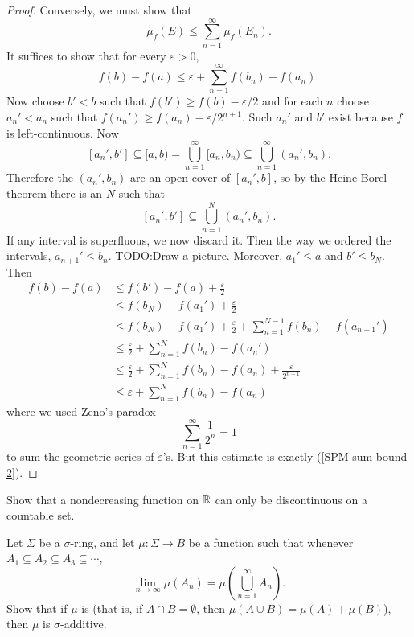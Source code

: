 \begin{proof}
Conversely, we must show that
\[\mu_{f}(E) \leq \sum_{n=1}^{\infty} \mu_{f}(E_{n}).\]
It suffices to show that for every $\varepsilon > 0$,
\begin{equation}\label{SPM sum bound 2}
f(b) - f(a) \leq \varepsilon + \sum_{n=1}^{\infty} f(b_{n}) - f(a_{n}).
\end{equation}
Now choose $b' < b$ such that $f(b') \geq f(b) - \varepsilon/2$ and for each $n$ choose $a_{n}' < a_{n}$ such that $f(a_{n}') \geq f(a_{n}) - \varepsilon/2^{n+1}$.
Such $a_{n}'$ and $b'$ exist because $f$ is left-continuous.
Now
\[[a_{n}', b'] \subseteq [a, b) = \bigcup_{n=1}^{\infty} [a_{n}, b_{n}) \subseteq \bigcup_{n=1}^{\infty} (a_{n}', b_{n}).\]
Therefore the $(a_{n}', b_{n})$ are an open cover of $[a_{n}', b]$, so by the Heine-Borel theorem there is an $N$ such that
\[[a_{n}', b'] \subseteq \bigcup_{n=1}^{N} (a_{n}', b_{n}).\]
If any interval is superfluous, we now discard it.
Then the way we ordered the intervals, $a_{n+1}' \leq b_{n}$.
TODO:\@ Draw a picture.
Moreover, $a_{1}' \leq a$ and $b' \leq b_{N}$. Then
\begin{align*}
f(b) - f(a) &\leq f(b') - f(a) + \frac{\varepsilon}{2}\\
& \leq f(b_{N}) - f(a_{1}') + \frac{\varepsilon}{2}\\
& \leq f(b_{N}) - f(a_{1}') + \frac{\varepsilon}{2} + \sum_{n=1}^{N-1} f(b_{n}) - f(a_{n+1}')\\
& \leq \frac{\varepsilon}{2} + \sum_{n=1}^{N} f(b_{n}) - f(a_{n}')\\
& \leq \frac{\varepsilon}{2} + \sum_{n=1}^{N} f(b_{n}) - f(a_{n}) + \frac{\varepsilon}{2^{n+1}}\\
& \leq \varepsilon + \sum_{n=1}^{N} f(b_{n}) - f(a_{n})
\end{align*}
where we used Zeno's paradox
\begin{equation}\label{zeno}
\sum_{n=1}^{\infty} \frac{1}{2^{n}} = 1
\end{equation}
to sum the geometric series of $\varepsilon$'s.
But this estimate is exactly (\ref{SPM sum bound 2}).
\end{proof}

\begin{exercise}\label{nondecreasing exercise}
Show that a nondecreasing function on $\mathbb{R}$ can only be discontinuous on a countable set.
\end{exercise}

\begin{exercise}
Let $\Sigma$ be a $\sigma$-ring, and let $\mu: \Sigma \to B$ be a function such that whenever $A_{1} \subseteq A_{2} \subseteq A_{3} \subseteq \cdots$,
\[\lim_{n \to \infty} \mu(A_{n}) = \mu\left(\bigcup_{n=1}^{\infty} A_{n}\right).\]
Show that if $\mu$ is  (that is, if $A \cap B = \emptyset$, then $\mu(A \cup B) = \mu(A) + \mu(B)$), then $\mu$ is $\sigma$-additive.
\end{exercise}


